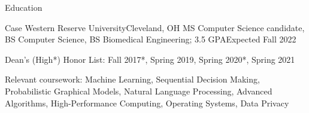 \begin{rsection}{Education}
\begin{ritemize}
{Case Western Reserve University}{Cleveland, OH}
{MS Computer Science candidate, BS Computer Science, BS Biomedical Engineering; 3.5 GPA}{Expected Fall 2022}
	\item Dean's (High*) Honor List: Fall 2017*, Spring 2019, Spring 2020*, Spring 2021
	\item Relevant coursework:
	Machine Learning,
	Sequential Decision Making,
	Probabilistic Graphical Models,
	Natural Language Processing,
	Advanced Algorithms,
	High-Performance Computing,
	Operating Systems,
	Data Privacy
\end{ritemize}
\end{rsection}